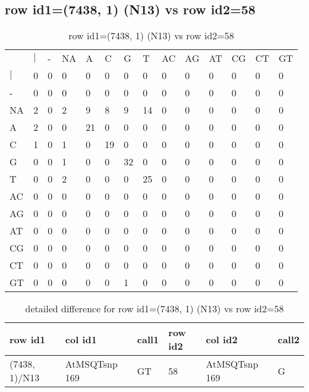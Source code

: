\subsection{row id1=(7438, 1) (N13) vs row id2=58}
\begin{center}
\begin{longtable}{|l|l|l|l|l|l|l|l|l|l|l|l|l|l|}
\caption{row id1=(7438, 1) (N13) vs row id2=58} \label{table_dm316}\\
\hline
\\
\hline
&$|$&-&NA&A&C&G&T&AC&AG&AT&CG&CT&GT\\
$|$&0&0&0&0&0&0&0&0&0&0&0&0&0\\
-&0&0&0&0&0&0&0&0&0&0&0&0&0\\
NA&2&0&2&9&8&9&14&0&0&0&0&0&0\\
A&2&0&0&21&0&0&0&0&0&0&0&0&0\\
C&1&0&1&0&19&0&0&0&0&0&0&0&0\\
G&0&0&1&0&0&32&0&0&0&0&0&0&0\\
T&0&0&2&0&0&0&25&0&0&0&0&0&0\\
AC&0&0&0&0&0&0&0&0&0&0&0&0&0\\
AG&0&0&0&0&0&0&0&0&0&0&0&0&0\\
AT&0&0&0&0&0&0&0&0&0&0&0&0&0\\
CG&0&0&0&0&0&0&0&0&0&0&0&0&0\\
CT&0&0&0&0&0&0&0&0&0&0&0&0&0\\
GT&0&0&0&0&0&1&0&0&0&0&0&0&0\\
\hline
\end{longtable}
\end{center}

\begin{center}
\begin{longtable}{|l|l|l|l|l|l|}
\caption{detailed difference for row id1=(7438, 1) (N13) vs row id2=58} \label{table_dm317}\\
\hline
row id1&col id1&call1&row id2&col id2&call2\\
\hline
(7438, 1)/N13&AtMSQTsnp 169&GT&58&AtMSQTsnp 169&G\\
\hline
\end{longtable}
\end{center}

